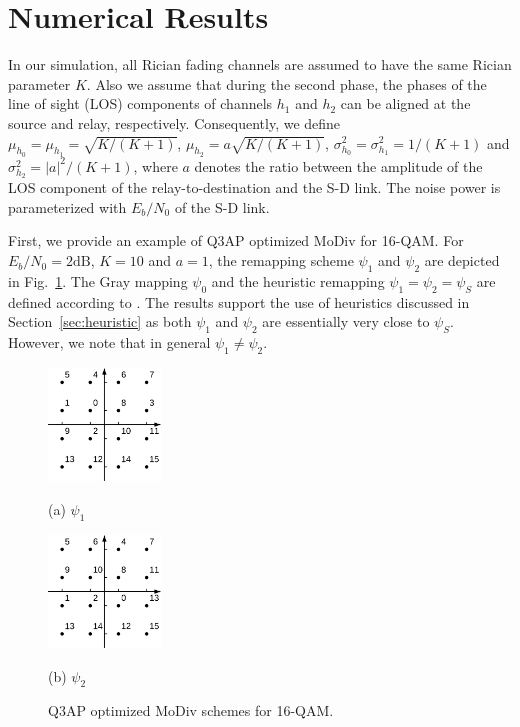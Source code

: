 \documentclass[journal]{IEEEtran}
\begin{document}
\section{Numerical Results}
\label{sec:simulation}
In our simulation, all Rician fading channels are assumed to have the same
Rician parameter $K$. Also we assume that during the second phase, the phases of the
line of sight (LOS) components of channels $h_1$ and $h_2$ can be aligned at the
source and relay, respectively.
Consequently, we define $\mu_{h_0} = \mu_{h_1} = \sqrt{K/(K + 1)}$,
$\mu_{h_2}=a\sqrt{K/(K + 1)}$,  $\sigma_{h_0}^2 = \sigma_{h_1}^2 = 1/(K+1)$ and
$\sigma_{h_2}^2 = |a|^2/(K+1)$, where $a$ denotes the ratio
between the amplitude of the LOS component of the
relay-to-destination and the S-D link. The noise power is
parameterized with $E_b/N_0$ of the S-D link.

First, we provide an example of Q3AP optimized MoDiv for 16-QAM. For $E_b/N_0 =
2\mbox{dB}$, $K = 10$ and $a = 1$, the remapping scheme $\psi_1$ and $\psi_2$
are depicted in Fig.~\ref{fig:example}. The Gray mapping $\psi_0$ and the
heuristic remapping $\psi_1=\psi_2=\psi_S$ are defined according to
\cite{seddik2008trans}. The results support the use of heuristics discussed in
Section~\ref{sec:heuristic} as both $\psi_1$ and $\psi_2$ are essentially very
close to $\psi_S$. However, we note that in general $\psi_1\not=\psi_2$.

\begin{figure}[!t]
    \begin{minipage}[b]{0.48\linewidth}
      \centering
      \centerline{\includegraphics[width=3.0cm]{./figs/psi1.eps}}
      \centerline{(a) $\psi_1$}\medskip
    \end{minipage}
    \hfill
    \begin{minipage}[b]{.48\linewidth}
      \centering
      \centerline{\includegraphics[width=3.0cm]{./figs/psi2.eps}}
      \centerline{(b) $\psi_2$}\medskip
    \end{minipage}
    \caption{Q3AP optimized MoDiv schemes for 16-QAM.}
    \label{fig:example}
\end{figure}
\end{document}
